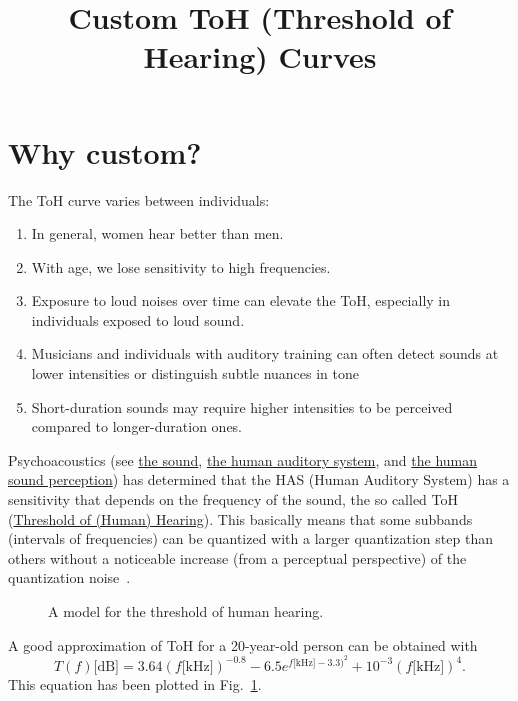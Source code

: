 
\title{Custom ToH (Threshold of Hearing) Curves}

\maketitle
\tableofcontents

\section{Why custom?}

The ToH curve varies between individuals:
\begin{enumerate}
\item In general, women hear better than men.
\item With age, we lose sensitivity to high frequencies.
\item Exposure to loud noises over time can elevate the ToH,
  especially in individuals exposed to loud sound.
\item Musicians and individuals with auditory training can often
  detect sounds at lower intensities or distinguish subtle nuances in
  tone
\item Short-duration sounds may require higher intensities to be
  perceived compared to longer-duration ones.
\end{enumerate}

Psychoacoustics (see
\href{https://vicente-gonzalez-ruiz.github.io/the_sound/}{the sound},
\href{https://vicente-gonzalez-ruiz.github.io/human_auditory_system/}{the
  human auditory system}, and
\href{https://vicente-gonzalez-ruiz.github.io/human_sound_perception/}{the
  human sound perception}) has determined that the HAS (Human Auditory
System) has a sensitivity that depends on the frequency of the sound,
the so called ToH
(\href{https://en.wikipedia.org/wiki/Absolute_threshold_of_hearing}{Threshold
  of (Human) Hearing}). This basically means that some subbands
(intervals of frequencies) can be quantized with a larger quantization
step than others without a noticeable increase (from a perceptual
perspective) of the quantization noise~\cite{sayood2017introduction}.

\begin{figure}
  \centering
  \caption{A model for the threshold of human hearing.}
  \label{fig:ToHH}
\end{figure}

A good approximation of ToH for a 20-year-old person can be
obtained with~\cite{bosi2003intro}
\begin{equation}
  T(f)\text{[dB]} = 3.64(f\text{[kHz]})^{-0.8} - 6.5e^{f\text{[kHz]}-3.3)^2} + 10^{-3}(f\text{[kHz]})^4.
  \label{eq:ToHH}
\end{equation}
This equation has been plotted in Fig.~\ref{fig:ToHH}.

